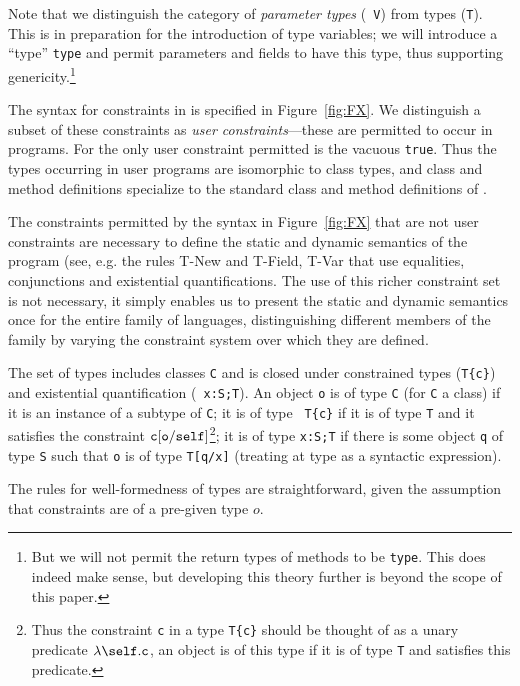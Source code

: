 Note that we distinguish the category of {\em parameter types} ({\tt
V}) from types ({\tt T}). This is in preparation for the introduction
of type variables; we will introduce a ``type'' {\tt type} and permit
parameters and fields to have this type, thus supporting
genericity.\footnote{But we will not permit the return types of
methods to be {\tt type}. This does indeed make sense, but developing
this theory further is beyond the scope of this paper.}

The syntax for constraints in \FXZ{} is specified in
Figure~\ref{fig:FX}. We distinguish a subset of these constraints as
{\em user constraints}---these are permitted to occur in
programs. For \FXZ{} the only user constraint permitted is the vacuous
{\tt true}. Thus the types occurring in user programs are isomorphic
to class types, and class and method definitions specialize to the
standard class and method definitions of \FJ{}. 

The constraints permitted by the syntax in Figure~\ref{fig:FX} that
are not user constraints are necessary to define the static and
dynamic semantics of the program (see, e.g.{} the rules {\sc T-New}
and {\sc T-Field}, {\sc T-Var} that use equalities, conjunctions and
existential quantifications. The use of this richer constraint set is
not necessary, it simply enables us to present the static and dynamic
semantics once for the entire family of \FX{} languages,
distinguishing different members of the family by varying the
constraint system over which they are defined.

The set of types includes classes {\tt C} and is closed under
constrained types ({\tt T\{c\}}) and existential quantification ({\tt
x:S;T}). An object {\tt o} is of type {\tt C} (for {\tt C} a class)
if it is an instance of a subtype of {\tt C}; it is of type {\tt
T\{c\}} if it is of type {\tt T} and it satisfies the constraint $\tt
c[o/self]$\footnote{Thus the constraint {\tt c} in a type {\tt T\{c\}}
should be thought of as a unary predicate $\lambda\self.{\tt c}$, an
object is of this type if it is of type {\tt T} and satisfies this
predicate.}; it is of type {\tt x:S;T} if there is some object {\tt q}
of type {\tt S} such that {\tt o} is of type {\tt T[q/x]} (treating at
type as a syntactic expression).

The rules for well-formedness of types are straightforward, given 
the assumption that constraints are of a pre-given type $o$.

